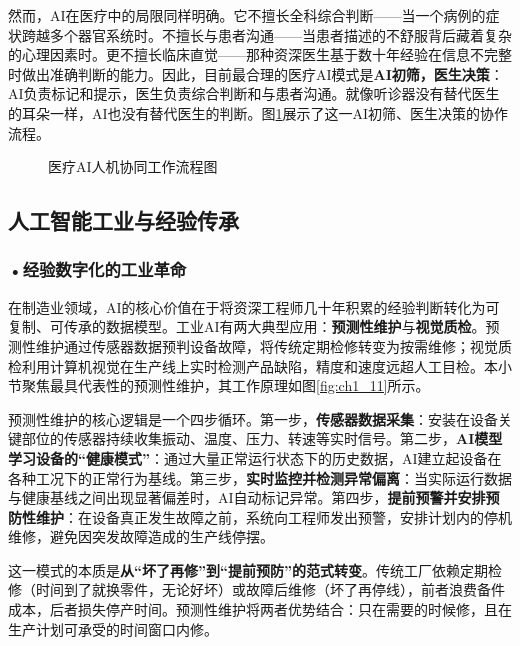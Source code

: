 然而，AI在医疗中的局限同样明确。它不擅长全科综合判断——当一个病例的症状跨越多个器官系统时。不擅长与患者沟通——当患者描述的不舒服背后藏着复杂的心理因素时。更不擅长临床直觉——那种资深医生基于数十年经验在信息不完整时做出准确判断的能力。因此，目前最合理的医疗AI模式是\textbf{AI初筛，医生决策}：AI负责标记和提示，医生负责综合判断和与患者沟通。就像听诊器没有替代医生的耳朵一样，AI也没有替代医生的判断。图\ref{fig:ch1_10}展示了这一AI初筛、医生决策的协作流程。

\begin{figure}[htbp]
\centering
{}
\caption{医疗AI人机协同工作流程图}
\label{fig:ch1_10}
\end{figure}

\subsection{人工智能工业与经验传承}

\subsubsection*{\textbf{•经验数字化的工业革命}}

在制造业领域，AI的核心价值在于将资深工程师几十年积累的经验判断转化为可复制、可传承的数据模型。工业AI有两大典型应用：\textbf{预测性维护}与\textbf{视觉质检}。预测性维护通过传感器数据预判设备故障，将传统定期检修转变为按需维修；视觉质检利用计算机视觉在生产线上实时检测产品缺陷，精度和速度远超人工目检。本小节聚焦最具代表性的预测性维护，其工作原理如图\ref{fig:ch1_11}所示。

预测性维护的核心逻辑是一个四步循环。第一步，\textbf{传感器数据采集}：安装在设备关键部位的传感器持续收集振动、温度、压力、转速等实时信号。第二步，\textbf{AI模型学习设备的``健康模式''}：通过大量正常运行状态下的历史数据，AI建立起设备在各种工况下的正常行为基线。第三步，\textbf{实时监控并检测异常偏离}：当实际运行数据与健康基线之间出现显著偏差时，AI自动标记异常。第四步，\textbf{提前预警并安排预防性维护}：在设备真正发生故障之前，系统向工程师发出预警，安排计划内的停机维修，避免因突发故障造成的生产线停摆。

这一模式的本质是\textbf{从``坏了再修''到``提前预防''的范式转变}。传统工厂依赖定期检修（时间到了就换零件，无论好坏）或故障后维修（坏了再停线），前者浪费备件成本，后者损失停产时间。预测性维护将两者优势结合：只在需要的时候修，且在生产计划可承受的时间窗口内修。

